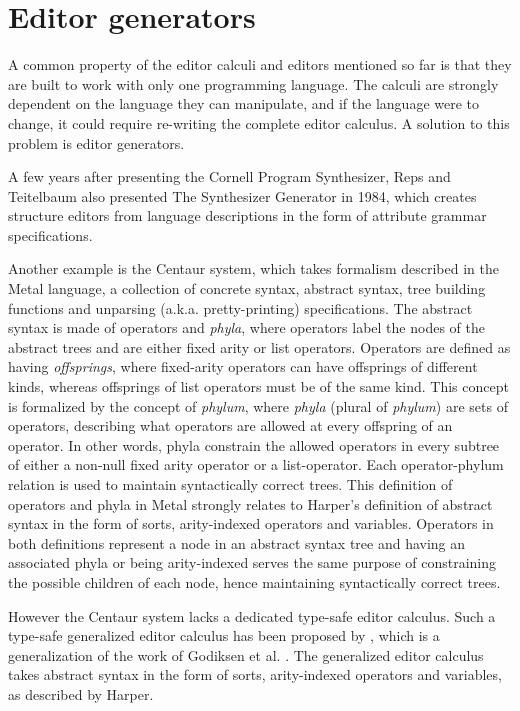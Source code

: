 \section{Editor generators}
A common property of the editor calculi and editors mentioned so far is that they are built to work with only one programming language. The calculi are strongly dependent on the language they can manipulate, and if the language were to change, it could require re-writing the complete editor calculus. A solution to this problem is editor generators.

A few years after presenting the Cornell Program Synthesizer, Reps and Teitelbaum also presented The Synthesizer Generator\cite{timtom84} in 1984, which creates structure editors from language descriptions in the form of attribute grammar specifications.

Another example is the Centaur system\cite{centaur}, which takes formalism described in the Metal language\cite{metal}, a collection of concrete syntax, abstract syntax, tree building functions and unparsing (a.k.a. pretty-printing) specifications. The abstract syntax is made of operators and \textit{phyla}, where operators label the nodes of the abstract trees and are either fixed arity or list operators. Operators are defined as having \textit{offsprings}, where fixed-arity operators can have offsprings of different kinds, whereas offsprings of list operators must be of the same kind. This concept is formalized by the concept of \textit{phylum}, where \textit{phyla} (plural of \textit{phylum}) are sets of operators, describing what operators are allowed at every offspring of an operator. In other words, phyla constrain the allowed operators in every subtree of either a non-null fixed arity operator or a list-operator. Each operator-phylum relation is used to maintain syntactically correct trees.
This definition of operators and phyla in Metal strongly relates to Harper's definition of abstract syntax\cite{harper} in the form of sorts, arity-indexed operators and variables. Operators in both definitions represent a node in an abstract syntax tree and having an associated phyla or being arity-indexed serves the same purpose of constraining the possible children of each node, hence maintaining syntactically correct trees.

However the Centaur system\cite{centaur} lacks a dedicated type-safe editor calculus. Such a type-safe generalized editor calculus has been proposed by \cite{aalborg}, which is a generalization of the work of Godiksen et al. \cite{godiksen}. The generalized editor calculus takes abstract syntax in the form of sorts, arity-indexed operators and variables, as described by Harper\cite{harper}.

